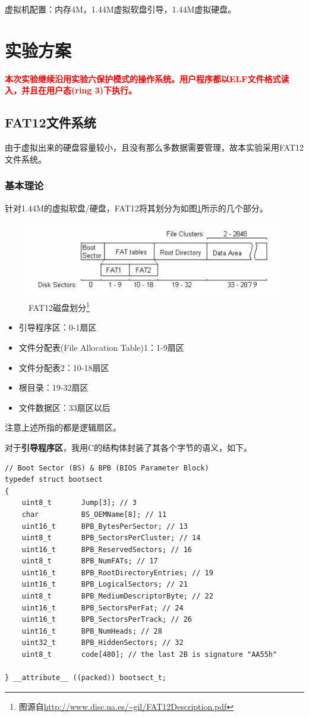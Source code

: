 \documentclass[logo,reportComp]{thesis}
\begin{document}
虚拟机配置：内存4M，1.44M虚拟软盘引导，1.44M虚拟硬盘。

\section{实验方案}
{\textbf{\textcolor{red}{本次实验继续沿用实验六保护模式的操作系统。用户程序都以ELF文件格式读入，并且在用户态(ring 3)下执行。}}}

\subsection{FAT12文件系统}
由于虚拟出来的硬盘容量较小，且没有那么多数据需要管理，故本实验采用FAT12文件系统。

\subsubsection{基本理论}
针对1.44M的虚拟软盘/硬盘，FAT12将其划分为如图\ref{fig:disk}所示的几个部分。
\begin{figure}[H]
\centering
\includegraphics[width=0.6\linewidth]{fig/disk_organization.png}
\caption{FAT12磁盘划分\protect\footnote{图源自\url{http://www.disc.ua.es/~gil/FAT12Description.pdf}}}
\label{fig:disk}
\end{figure}
\begin{itemize}
	\item 引导程序区：0-1扇区
	\item 文件分配表(File Allocation Table)1：1-9扇区
	\item 文件分配表2：10-18扇区
	\item 根目录：19-32扇区
	\item 文件数据区：33扇区以后
\end{itemize}

注意上述所指的都是逻辑扇区。

对于\textbf{引导程序区}，我用C的结构体封装了其各个字节的语义，如下。
\begin{lstlisting}
// Boot Sector (BS) & BPB (BIOS Parameter Block)
typedef struct bootsect
{
	uint8_t	      Jump[3]; // 3
	char          BS_OEMName[8]; // 11
	uint16_t      BPB_BytesPerSector; // 13
	uint8_t       BPB_SectorsPerCluster; // 14
	uint16_t      BPB_ReservedSectors; // 16
	uint8_t       BPB_NumFATs; // 17
	uint16_t      BPB_RootDirectoryEntries; // 19
	uint16_t      BPB_LogicalSectors; // 21
	uint8_t       BPB_MediumDescriptorByte; // 22
	uint16_t      BPB_SectorsPerFat; // 24
	uint16_t      BPB_SectorsPerTrack; // 26
	uint16_t      BPB_NumHeads; // 28
	uint32_t      BPB_HiddenSectors; // 32
	uint8_t       code[480]; // the last 2B is signature "AA55h"

} __attribute__ ((packed)) bootsect_t;
\end{lstlisting}
\end{document}
